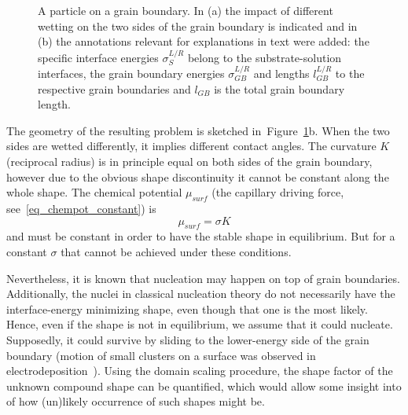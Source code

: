 \begin{figure}
	\centering
	\caption[Sketch - a particle on a grain boundary]{A particle on a grain boundary. In (a) the impact of different wetting on the two sides of the grain boundary is indicated and in (b) the annotations relevant for explanations in text were added: the specific interface energies $\sigma_S^{L/R}$ belong to the substrate-solution interfaces, the grain boundary energies $\sigma_{GB}^{L/R}$ and lengths $l_{GB}^{L/R}$ to the respective grain boundaries and $l_{GB}$ is the total grain boundary length.}
	\label{fig_sketch_particle_onGB}
\end{figure}

The geometry of the resulting problem is sketched in~Figure~\ref{fig_sketch_particle_onGB}b. When the two sides are wetted differently, it implies different contact angles. The curvature $K$ (reciprocal radius) is in principle equal on both sides of the grain boundary, however due to the obvious shape discontinuity it cannot be constant along the whole shape. The chemical potential $\mu_{surf}$ (the capillary driving force, see~\eqref{eq_chempot_constant}) is
\begin{equation}
	\mu_{surf} = \sigma K 
\end{equation}
and must be constant in order to have the stable shape in equilibrium. But for a constant $\sigma$ that cannot be achieved under these conditions.

Nevertheless, it is known that nucleation may happen on top of grain boundaries. Additionally, the nuclei in classical nucleation theory do not necessarily have the interface-energy minimizing shape, even though that one is the most likely. Hence, even if the shape is not in equilibrium, we assume that it could nucleate. Supposedly, it could survive by sliding to the lower-energy side of the grain boundary (motion of small clusters on a surface was observed in electrodeposition~\cite{Ustarroz2013}). Using the domain scaling procedure, the shape factor of the unknown compound shape can be quantified, which would allow some insight into of how (un)likely occurrence of such shapes might be.

